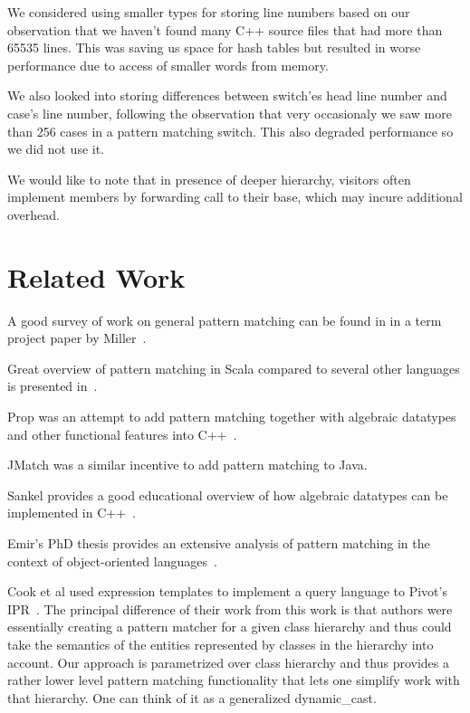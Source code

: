\documentclass[submission,copyright]{eptcs}
\begin{document}
We considered using smaller types for storing line numbers based on our 
observation that we haven't found many C++ source files that had more than 65535 
lines. This was saving us space for hash tables but resulted in worse 
performance due to access of smaller words from memory.

We also looked into storing differences between switch'es head line number and 
case's line number, following the observation that very occasionaly we saw more 
than 256 cases in a pattern matching switch. This also degraded performance so 
we did not use it.

We would like to note that in presence of deeper hierarchy, visitors often 
implement members by forwarding call to their base, which may incure additional 
overhead.

\section{Related Work} %
\label{sec:rw}

A good survey of work on general pattern matching can be found in in a term 
project paper by Miller~\cite{Miller10}.

Great overview of pattern matching in Scala compared to several other languages 
is presented in~\cite{ScalaPM}.

Prop was an attempt to add pattern matching together with algebraic datatypes 
and other functional features into C++~\cite{Prop96}.

JMatch was a similar incentive to add pattern matching to Java.

Sankel provides a good educational overview of how algebraic datatypes can be 
implemented in C++~\cite{SankelFP10,Sankel10}. 

Emir's PhD thesis provides an extensive analysis of pattern matching in the 
context of object-oriented languages~\cite{EmirThesis}.

Cook et al used expression templates to implement a query language to Pivot's 
IPR~\cite{iql04}. The principal difference of their work from this work is that 
authors were essentially creating a pattern matcher for a given class hierarchy 
and thus could take the semantics of the entities represented by classes in the 
hierarchy into account. Our approach is parametrized over class hierarchy and 
thus provides a rather lower level pattern matching functionality that lets one 
simplify work with that hierarchy.  One can think of it as a generalized 
dynamic\_cast.
\end{document}
